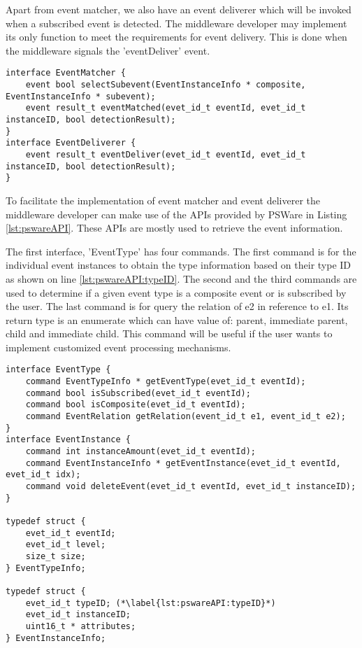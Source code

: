 Apart from event matcher, we also have an event deliverer which will be invoked when a subscribed event is detected. The middleware developer may implement its only function to meet the requirements for event delivery. This is done when the middleware signals the 'eventDeliver' event.
\begin{lstlisting}[caption=The event matcher interface, label=lst:pswareEventMatcher]
interface EventMatcher {
	event bool selectSubevent(EventInstanceInfo * composite, EventInstanceInfo * subevent);
	event result_t eventMatched(evet_id_t eventId, evet_id_t instanceID, bool detectionResult);
}
interface EventDeliverer {
	event result_t eventDeliver(evet_id_t eventId, evet_id_t instanceID, bool detectionResult);
}
\end{lstlisting}

To facilitate the implementation of event matcher and event deliverer the middleware developer can make use of the APIs provided by PSWare in Listing \ref{lst:pswareAPI}. These APIs are mostly used to retrieve the event information.

The first interface, 'EventType' has four commands. The first command is for the individual event instances to obtain the type information based on their type ID as shown on line \ref{lst:pswareAPI:typeID}. The second and the third commands are used to determine if a given event type is a composite event or is subscribed by the user. The last command is for query the relation of e2 in reference to e1. Its return type is an enumerate which can have value of: parent, immediate parent, child and immediate child. This command will be useful if the user wants to implement customized event processing mechanisms.

\begin{lstlisting}[caption=PSWare API in NesC, float, label=lst:pswareAPI]
interface EventType {
	command EventTypeInfo * getEventType(evet_id_t eventId);
	command bool isSubscribed(evet_id_t eventId);
	command bool isComposite(evet_id_t eventId);
	command EventRelation getRelation(event_id_t e1, event_id_t e2);
}
interface EventInstance {
	command int instanceAmount(evet_id_t eventId);
	command EventInstanceInfo * getEventInstance(evet_id_t eventId, evet_id_t idx);
	command void deleteEvent(evet_id_t eventId, evet_id_t instanceID);
}

typedef struct {
	evet_id_t eventId;
	evet_id_t level;
	size_t size;
} EventTypeInfo;

typedef struct {
	evet_id_t typeID; (*\label{lst:pswareAPI:typeID}*)
	evet_id_t instanceID;
	uint16_t * attributes;
} EventInstanceInfo;
\end{lstlisting}

